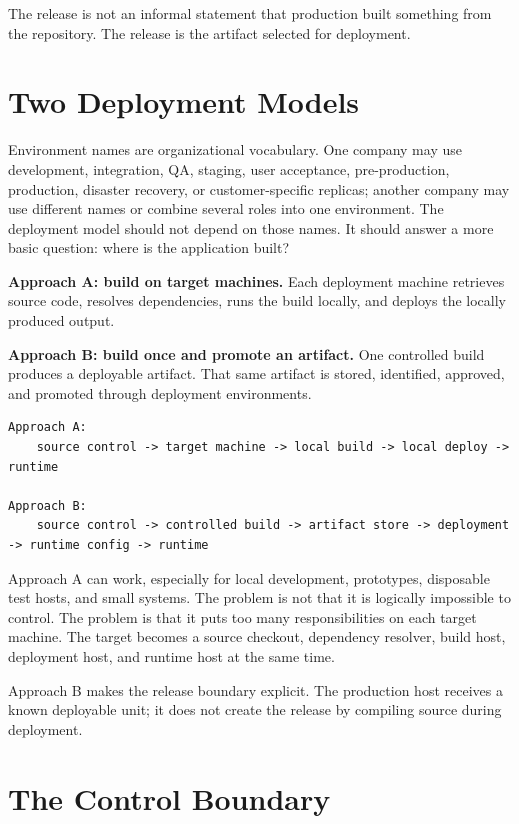 \documentclass[11pt]{article}
\begin{document}
The release is not an informal statement that production built something from the repository. The release is the artifact selected for deployment.

\section{Two Deployment Models}

Environment names are organizational vocabulary. One company may use development, integration, QA, staging, user acceptance, pre-production, production, disaster recovery, or customer-specific replicas; another company may use different names or combine several roles into one environment. The deployment model should not depend on those names. It should answer a more basic question: where is the application built?

\textbf{Approach A: build on target machines.} Each deployment machine retrieves source code, resolves dependencies, runs the build locally, and deploys the locally produced output.

\textbf{Approach B: build once and promote an artifact.} One controlled build produces a deployable artifact. That same artifact is stored, identified, approved, and promoted through deployment environments.

\begin{lstlisting}
Approach A:
    source control -> target machine -> local build -> local deploy -> runtime

Approach B:
    source control -> controlled build -> artifact store -> deployment -> runtime config -> runtime
\end{lstlisting}

Approach A can work, especially for local development, prototypes, disposable test hosts, and small systems. The problem is not that it is logically impossible to control. The problem is that it puts too many responsibilities on each target machine. The target becomes a source checkout, dependency resolver, build host, deployment host, and runtime host at the same time.

Approach B makes the release boundary explicit. The production host receives a known deployable unit; it does not create the release by compiling source during deployment.

\section{The Control Boundary}
\end{document}
